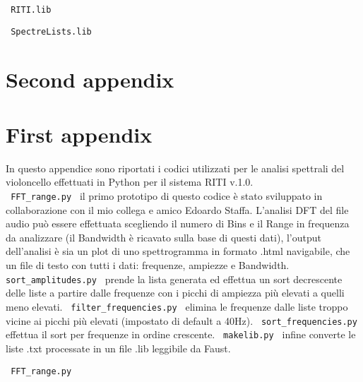 \begin{center} \Large \verb| RITI.lib | \normalsize \\
    \vspace{0.2cm} \end{center}

\clearpage

\begin{center} \Large \verb| SpectreLists.lib | \normalsize \\
    \vspace{0.2cm} \end{center}

\clearpage

\section{Second appendix}

\section{First appendix}

In questo appendice sono riportati i codici utilizzati per le analisi 
spettrali del violoncello effettuati in Python per il sistema RITI v.1.0. \\
\verb| FFT_range.py | il primo prototipo di questo codice è stato sviluppato
in collaborazione con il mio collega e amico Edoardo Staffa. 
L'analisi DFT del file audio può essere effettuata scegliendo il numero di Bins e 
il Range in frequenza da analizzare (il Bandwidth è ricavato sulla base di questi dati),
l'output dell'analisi è sia un plot di uno spettrogramma in formato .html navigabile,
che un file di testo con tutti i dati: frequenze, ampiezze e Bandwidth.
\verb| sort_amplitudes.py | prende la lista generata ed effettua un sort
decrescente delle liste a partire dalle frequenze con i picchi di ampiezza più 
elevati a quelli meno elevati. \verb| filter_frequencies.py | elimina le frequenze 
dalle liste troppo vicine ai picchi più elevati (impostato di default a 40Hz).
\verb| sort_frequencies.py | effettua il sort per frequenze in ordine crescente.
\verb| makelib.py | infine converte le liste .txt processate in un file .lib leggibile da Faust.
\clearpage


\begin{center} \Large \verb| FFT_range.py | \normalsize \\
    \vspace{0.2cm} \end{center}

\clearpage

